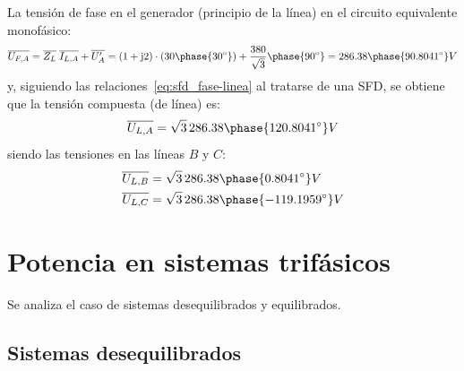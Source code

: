 \begin{example}
		
		La tensión de fase en el generador (principio de la línea) en el circuito equivalente monofásico:
		\begin{equation*}
		    \overline{U_{F,A}}=\overline{Z_L}\;\overline{I_{L,A}}+ \overline{U_A'}=(1+\mathrm{j}2)\cdot(30\phase{30^\circ})+\dfrac{380}{\sqrt{3}}\phase{90^\circ}=286.38\phase{90.8041^\circ} V
		\end{equation*}
		y, siguiendo las relaciones~\eqref{eq:sfd_fase-linea} al tratarse de una SFD, se obtiene que la tensión compuesta (de línea) es: 
		\begin{equation*}
		    \overline{U_{L,A}}=\sqrt{3}\,286.38\phase{120.8041^\circ} V 
		\end{equation*}
		siendo las tensiones en las líneas $B$ y $C$:
		\begin{align*}
			  \overline{U_{L,B}}&=\sqrt{3}\,286.38\phase{0.8041^\circ} V\\
			  \overline{U_{L,C}}&=\sqrt{3}\,286.38\phase{-119.1959^\circ} V
			\end{align*}
		\end{example}
	
	\section{Potencia en sistemas trifásicos}\label{sec:potencia_trifasica}
	Se analiza el caso de sistemas desequilibrados y equilibrados.
	
	\subsection{Sistemas desequilibrados}
	
